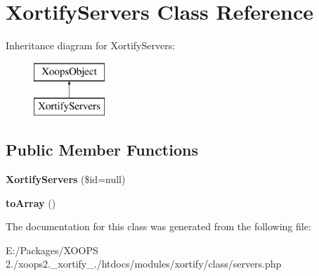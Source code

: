 \hypertarget{class_xortify_servers}{\section{Xortify\-Servers Class Reference}
\label{class_xortify_servers}
}
Inheritance diagram for Xortify\-Servers\-:\begin{figure}[H]
\begin{center}
\leavevmode
\includegraphics[height=2.000000cm]{class_xortify_servers}
\end{center}
\end{figure}
\subsection*{Public Member Functions}
\begin{DoxyCompactItemize}
\item 
\hypertarget{class_xortify_servers_a178e938b1b613c306495fef0bb20993d}{{\bfseries Xortify\-Servers} (\$id=null)}\label{class_xortify_servers_a178e938b1b613c306495fef0bb20993d}

\item 
\hypertarget{class_xortify_servers_aff40f0ae8b916f4ddb76e2b729b4e78f}{{\bfseries to\-Array} ()}\label{class_xortify_servers_aff40f0ae8b916f4ddb76e2b729b4e78f}

\end{DoxyCompactItemize}


The documentation for this class was generated from the following file\-:\begin{DoxyCompactItemize}
\item 
E\-:/\-Packages/\-X\-O\-O\-P\-S 2./xoops2.\-\_\-xortify\-\_./htdocs/modules/xortify/class/servers.\-php\end{DoxyCompactItemize}
